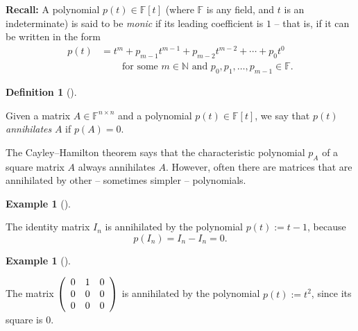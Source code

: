 \documentclass[numbers=enddot,12pt,final,onecolumn,notitlepage]{scrartcl}%
\numberwithin{exer}{subsection}
\theoremstyle{definition}
\newtheorem{defi}[theo]{Definition}
\newenvironment{definition}[1][]
{\begin{defi}[#1]\begin{leftbar}}
{\end{leftbar}\end{defi}}
\newtheorem{exam}[theo]{Example}
\newenvironment{example}[1][]
{\begin{exam}[#1]\begin{leftbar}}
{\end{leftbar}\end{exam}}
\begin{document}
\textbf{Recall:} A polynomial $p\left(  t\right)  \in\mathbb{F}\left[
t\right]  $ (where $\mathbb{F}$ is any field, and $t$ is an indeterminate) is
said to be \emph{monic} if its leading coefficient is $1$ -- that is, if it
can be written in the form%
\begin{align*}
p\left(  t\right)   &  =t^{m}+p_{m-1}t^{m-1}+p_{m-2}t^{m-2}+\cdots+p_{0}%
t^{0}\\
&  \ \ \ \ \ \ \ \ \ \ \text{for some }m\in\mathbb{N}\text{ and }p_{0}%
,p_{1},\ldots,p_{m-1}\in\mathbb{F}.
\end{align*}


\begin{definition}
\label{def.jnf.mipo.annih}Given a matrix $A\in\mathbb{F}^{n\times n}$ and a
polynomial $p\left(  t\right)  \in\mathbb{F}\left[  t\right]  $, we say that
$p\left(  t\right)  $ \emph{annihilates} $A$ if $p\left(  A\right)  =0$.
\end{definition}

The Cayley--Hamilton theorem says that the characteristic polynomial $p_{A}$
of a square matrix $A$ always annihilates $A$. However, often there are
matrices that are annihilated by other -- sometimes simpler -- polynomials.

\begin{example}
The identity matrix $I_{n}$ is annihilated by the polynomial $p\left(
t\right)  :=t-1$, because%
\[
p\left(  I_{n}\right)  =I_{n}-I_{n}=0.
\]

\end{example}

\begin{example}
The matrix $\left(
\begin{array}
[c]{ccc}%
0 & 1 & 0\\
0 & 0 & 0\\
0 & 0 & 0
\end{array}
\right)  $ is annihilated by the polynomial $p\left(  t\right)  :=t^{2}$,
since its square is $0$.
\end{example}
\end{document}
